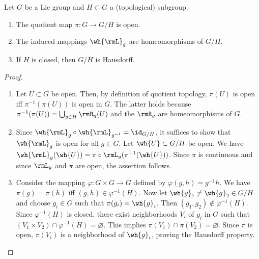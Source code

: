\begin{lem}[{{\cite[Lem.~5.7.1]{RS1}}}]\label{lem 5.7.1 RS1}
    Let $G$ be a Lie group and $H\subset G$ a (topological) subgroup.
    \begin{enumerate}
        \item The quotient map $\pi:G\to G\slash H$ is open.
        \item The induced mappings $\wh{\rmL}_g$ are homeomorphisms of $G\slash H$.
        \item If $H$ is closed, then $G\slash H$ is Hausdorff.
    \end{enumerate}
\end{lem}
\begin{proof}
    \begin{enumerate}
        \item Let $U\subset G$ be open. Then, by definition of quotient topology, $\pi(U)$ is open iff $\pi^{-1}(\pi(U))$ is open in $G$. The latter holds because $\pi^{-1}(\pi(U))=\bigcup_{g\in H}\rmR_g(U)$ and the $\rmR_g$ are homeomorphisms of $G$.
        \item Since $\wh{\rmL}_g\circ \wh{\rmL}_{g^{-1}}=\id_{G\slash H}$, it suffices to show that $\wh{\rmL}_g$ is open for all $g\in G$. Let $\wh{U}\subset G\slash H$ be open. We have $\wh{\rmL}_g(\wh{U})=\pi\circ \rmL_g(\pi^{-1}(\wh{U}))$. Since $\pi$ is continuous and since $\rmL_g$ and $\pi$ are open, the assertion follows.
        \item Consider the mapping $\varphi:G\times G\to G$  defined by $\varphi(g,h)=g^{-1}h$. We have $\pi(g)=\pi(h)$ iff $(g,h)\in\varphi^{-1}(H)$. Now let $\wh{g}_1\neq \wh{g}_2\in G\slash H$ and choose $g_i\in G$ such that $\pi(g_i)=\wh{g}_i$. Then $(g_1,g_2)\notin \varphi^{-1}(H)$. Since $\varphi^{-1}(H)$ is closed, there exist neighborhoods $V_i$ of $g_i$ in $G$ such that $(V_1\times V_2)\cap \varphi^{-1}(H)=\varnothing$. This implies $\pi(V_1)\cap\pi(V_2)=\varnothing$. Since $\pi$ is open, $\pi(V_i)$ is a neighborhood of $\wh{g}_i$, proving the Hausdorff property.
    \end{enumerate}
\end{proof}


